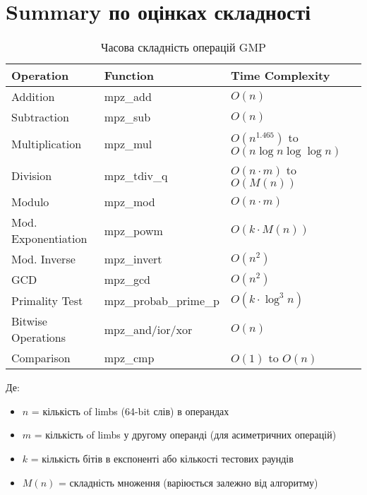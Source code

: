 \newpage
\section{Summary по оцінках складності}

\begin{table}[ht]
    \centering
    \begin{tabular}{|l|l|l|}
        \hline
        \textbf{Operation}  & \textbf{Function}     & \textbf{Time Complexity}                    \\
        \hline
        Addition            & mpz\_add              & $O(n)$                                      \\
        Subtraction         & mpz\_sub              & $O(n)$                                      \\
        Multiplication      & mpz\_mul              & $O(n^{1.465})$ to $O(n \log n \log \log n)$ \\
        Division            & mpz\_tdiv\_q          & $O(n \cdot m)$ to $O(M(n))$                 \\
        Modulo              & mpz\_mod              & $O(n \cdot m)$                              \\
        Mod. Exponentiation & mpz\_powm             & $O(k \cdot M(n))$                           \\
        Mod. Inverse        & mpz\_invert           & $O(n^{2})$                                  \\
        GCD                 & mpz\_gcd              & $O(n^{2})$                                  \\
        Primality Test      & mpz\_probab\_prime\_p & $O(k \cdot \log^{3} n)$                     \\
        Bitwise Operations  & mpz\_and/ior/xor      & $O(n)$                                      \\
        Comparison          & mpz\_cmp              & $O(1)$ to $O(n)$                            \\
        \hline
    \end{tabular}
    \caption{Часова складність операцій GMP}
\end{table}

Де:
\begin{itemize}
    \item $n$ = кількість of limbs (64-bit слів) в операндах
    \item $m$ = кількість of limbs у другому операнді (для асиметричних операцій)
    \item $k$ = кількість бітів в експоненті або кількості тестових раундів
    \item $M(n)$ = складність множення (варіюється залежно від алгоритму)
\end{itemize}

